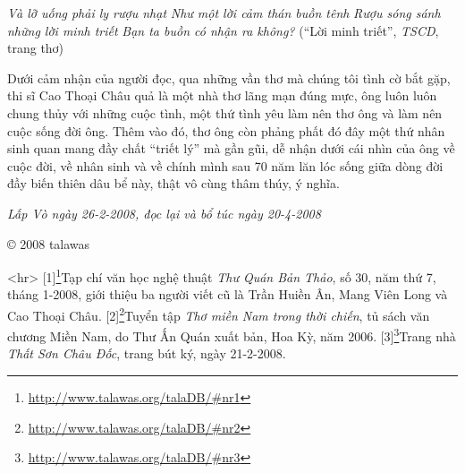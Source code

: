 \documentclass[../main.tex]{subfiles}
\begin{document}
\begin{multicols}{2}
\begin{blockquote}
\textit{Và lỡ uống phải ly rượu nhạt}        
\textit{Như một lời cảm thán buồn tênh}        
\textit{Rượu sóng sánh những lời minh triết}        
\textit{Bạn ta buồn có nhận ra không?}        
(“Lời minh triết”, \textit{TSCD}, trang thơ) 

\end{blockquote}
 
Dưới cảm nhận của người đọc, qua những vần thơ mà chúng tôi tình cờ bắt gặp, thi sĩ Cao Thoại Châu quả là một nhà thơ lãng mạn đúng mực, ông luôn luôn chung thủy với những cuộc tình, một thứ tình yêu làm nên thơ ông và làm nên cuộc sống đời ông. Thêm vào đó, thơ ông còn phảng phất đó đây một thứ nhân sinh quan mang đầy chất “triết lý” mà gần gũi, dễ nhận dưới cái nhìn của ông về cuộc đời, về nhân sinh và về chính mình sau 70 năm lăn lóc sống giữa dòng đời đầy biến thiên dâu bể này, thật vô cùng thâm thúy, ý nghĩa. 
 
\textit{Lấp Vò ngày 26-2-2008, đọc lại và bổ túc ngày 20-4-2008} 
 
© 2008 talawas 
 
 <hr>
\small{[1]}\footnote{\url{http://www.talawas.org/talaDB/#nr1}}Tạp chí văn học nghệ thuật \textit{Thư Quán Bản Thảo}, số 30, năm thứ 7, tháng 1-2008, giới thiệu ba người viết cũ là Trần Huiền Ân, Mang Viên Long và Cao Thoại Châu. 
 \small{[2]}\footnote{\url{http://www.talawas.org/talaDB/#nr2}}Tuyển tập \textit{Thơ miền Nam trong thời chiến}, tủ sách văn chương Miền Nam, do Thư Ấn Quán xuất bản, Hoa Kỳ, năm 2006. 
 \small{[3]}\footnote{\url{http://www.talawas.org/talaDB/#nr3}}Trang nhà \textit{Thất Sơn Châu Đốc}, trang bút ký, ngày 21-2-2008.
 
\end{multicols}
\end{document}
